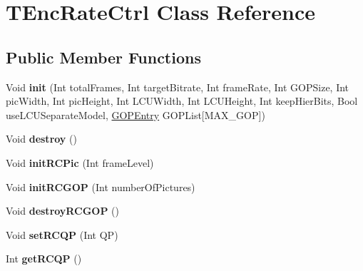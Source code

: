 \hypertarget{class_t_enc_rate_ctrl}{}\section{T\+Enc\+Rate\+Ctrl Class Reference}
\label{class_t_enc_rate_ctrl}
\subsection*{Public Member Functions}
\begin{DoxyCompactItemize}
\item 
\mbox{\label{class_t_enc_rate_ctrl_a3573825510eb67f7dfb6e157ac60acb7}} 
Void {\bfseries init} (Int total\+Frames, Int target\+Bitrate, Int frame\+Rate, Int G\+O\+P\+Size, Int pic\+Width, Int pic\+Height, Int L\+C\+U\+Width, Int L\+C\+U\+Height, Int keep\+Hier\+Bits, Bool use\+L\+C\+U\+Separate\+Model, \hyperlink{struct_g_o_p_entry}{G\+O\+P\+Entry} G\+O\+P\+List\mbox{[}M\+A\+X\+\_\+\+G\+OP\mbox{]})
\item 
\mbox{\label{class_t_enc_rate_ctrl_a47479cbf8644b9e112e6b72f409f7956}} 
Void {\bfseries destroy} ()
\item 
\mbox{\label{class_t_enc_rate_ctrl_aa68f99878bef8f446e0df54a71623e35}} 
Void {\bfseries init\+R\+C\+Pic} (Int frame\+Level)
\item 
\mbox{\label{class_t_enc_rate_ctrl_aa0cc14677a13f6dc376b70942cb1164b}} 
Void {\bfseries init\+R\+C\+G\+OP} (Int number\+Of\+Pictures)
\item 
\mbox{\label{class_t_enc_rate_ctrl_a732526606166cc7cd4acc565a66d7dc8}} 
Void {\bfseries destroy\+R\+C\+G\+OP} ()
\item 
\mbox{\label{class_t_enc_rate_ctrl_a019f24db3dc302b008f8ea8c12c80b0b}} 
Void {\bfseries set\+R\+C\+QP} (Int QP)
\item 
\mbox{\label{class_t_enc_rate_ctrl_a8dd22f02a2e94ddd02b856db75f048ee}} 
Int {\bfseries get\+R\+C\+QP} ()
\item 
\mbox{\label{class_t_enc_rate_ctrl_a0ca7564e37ff69979b1f9630571ce361}} 

\end{DoxyCompactItemize}
